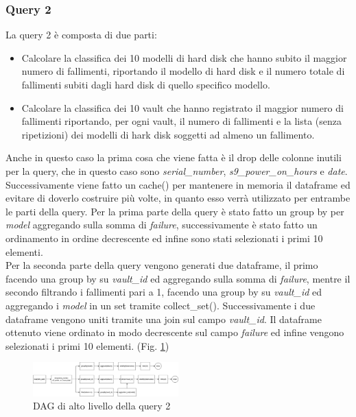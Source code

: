 \documentclass[conference]{IEEEtran}
\begin{document}
\subsubsection{Query 2}
La query 2 è composta di due parti:
\begin{itemize}
    \item Calcolare la classifica dei 10 modelli di hard disk che hanno subito il maggior numero di fallimenti, riportando il modello di hard disk e il numero totale di fallimenti subiti dagli hard disk di quello specifico modello.
    \item Calcolare la classifica dei 10 vault che hanno registrato il maggior numero di
    fallimenti riportando, per ogni vault, il numero di fallimenti e la lista (senza ripetizioni) dei modelli di
    hark disk soggetti ad almeno un fallimento.
\end{itemize}
Anche in questo caso la prima cosa che viene fatta è il drop delle colonne inutili per la query, che in questo caso sono \textit{serial\_number}, \textit{s9\_power\_on\_hours} e \textit{date}. Successivamente viene fatto un cache() per mantenere in memoria il dataframe ed evitare di doverlo costruire più volte, in quanto esso verrà utilizzato per entrambe le parti della query.
Per la prima parte della query è stato fatto un group by per \textit{model} aggregando sulla somma di \textit{failure}, successivamente è stato fatto un ordinamento in ordine decrescente ed infine sono stati selezionati i primi 10 elementi.\\
Per la seconda parte della query vengono generati due dataframe, il primo facendo una group by su \textit{vault\_id} ed aggregando sulla somma di \textit{failure}, mentre il secondo filtrando i fallimenti pari a 1, facendo una group by su \textit{vault\_id} ed aggregando i \textit{model} in un set tramite collect\_set(). Successivamente i due dataframe vengono uniti tramite una join sul campo \textit{vault\_id}. Il dataframe ottenuto viene ordinato in modo decrescente sul campo \textit{failure} ed infine vengono selezionati i primi 10 elementi. (Fig. \ref{fig:dag_query2})
\begin{figure}[H]
    \centerline{\includegraphics[width=0.5\textwidth]{res/query2_dag.png}}
    \caption{DAG di alto livello della query 2}
    \label{fig:dag_query2}
\end{figure}
\end{document}
